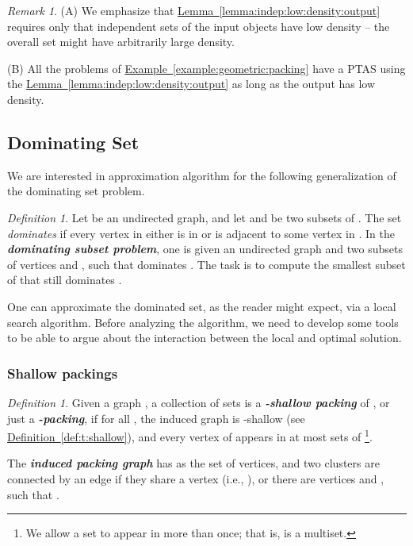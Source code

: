 \documentclass[12pt]{article}
\newcommand{\Term}[1]{\textsf{#1}}
\newcommand{\emphic}[2]{\textcolor{blue25}{\textbf{\emph{#1}}}\index{#2}}
\renewcommand{\emphic}[2]{\textbf{\emph{#1}}}
\newcommand{\emphi}[1]{\emphic{#1}{#1}}
\theoremstyle{remark}\theoremheaderfont{\sf}\theorembodyfont{\upshape}
\newtheorem{defn}[theorem]{Definition}
\newtheorem*{remark:unnumbered}[theorem]{Remark}\newtheorem{remark}[theorem]{Remark}\newtheorem{example}[theorem]{Example}
\numberwithin{figure}{section}\numberwithin{table}{section}\numberwithin{equation}{section}
\newcommand{\HLink}[2]{\hyperref[#2]{#1~\ref*{#2}}}
\newcommand{\HLinkPage}[2]{\hyperref[#2]{#1~\ref*{#2}}}
\newcommand{\seclab}[1]{\label{sec:#1}} \newcommand{\secref}[1]{\HLink{Section}{sec:#1}} \newcommand{\secrefpage}[1]{\HLinkPage{Section}{sec:#1}}
\providecommand{\deflab}[1]{\label{def:#1}}
\newcommand{\defref}[1]{\HLink{Definition}{def:#1}}
\newcommand{\exmref}[1]{\HLink{Example}{example:#1}}
\newcommand{\lemref}[1]{\HLink{Lemma}{lemma:#1}}
\newcommand{\PTAS}{\Term{PTAS}\xspace}
\begin{document}
\begin{remark:unnumbered}
  (A) We emphasize that \lemref{indep:low:density:output} requires
  only that independent sets of the input objects  have low
  density -- the overall set  might have arbitrarily large
  density.

  (B) All the problems of \exmref{geometric:packing} have a \PTAS
  using the \lemref{indep:low:density:output} as long as the output
  has low density.
\end{remark:unnumbered}



\subsection{Dominating Set} \seclab{dom:set}

We are interested in approximation algorithm for the following
generalization of the dominating set problem.

\begin{defn}
  Let  be an undirected graph, and let  and
   be two subsets of .  The set 
  \emph{dominates}  if every vertex in  either is in
   or is adjacent to some vertex in . In the
  \emphi{dominating subset problem}, one is given an undirected graph
   and two subsets of vertices  and ,
  such that  dominates . The task is to compute the
  smallest subset of  that still dominates .
\end{defn}

One can approximate the dominated set, as the reader might expect, via
a local search algorithm.  Before analyzing the algorithm, we need to
develop some tools to be able to argue about the interaction between
the local and optimal solution.

\subsubsection{Shallow packings}

\begin{defn}
  \deflab{shallow:packing}Given a graph , a collection of sets
   is a
  \emphi{-shallow packing} of , or just a
  \emphi{-packing}, if for all , the induced graph
   is -shallow (see \defref{t:shallow}), and
  every vertex of  appears in at most  sets of
  \footnote{We allow a set  to appear in  more
    than once; that is,  is a multiset.}.

  The \emphi{induced packing graph}  has
   as the set of vertices, and two clusters
   are connected by an edge if they
  share a vertex (i.e., ), or
  there are vertices  and , such that
  .
\end{defn}
\end{document}
